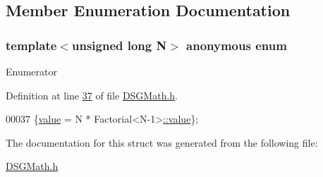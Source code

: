 \subsection{Member Enumeration Documentation}
\hypertarget{struct_d_s_g_1_1_factorial_a2443a477420ba8fc5494b186a58dcacc}{\subsubsection[{anonymous enum}]{\setlength{\rightskip}{0pt plus 5cm}template$<$unsigned long N$>$ anonymous enum}}\label{struct_d_s_g_1_1_factorial_a2443a477420ba8fc5494b186a58dcacc}
\begin{Desc}
\item[Enumerator]\par
\begin{description}
\item[{\em 
\hypertarget{struct_d_s_g_1_1_factorial_a2443a477420ba8fc5494b186a58dcaccaebc078d57d6fc1fbd5953d284c9cde04}{value}\label{struct_d_s_g_1_1_factorial_a2443a477420ba8fc5494b186a58dcaccaebc078d57d6fc1fbd5953d284c9cde04}
}]\end{description}
\end{Desc}


Definition at line \hyperlink{_d_s_g_math_8h_source_l00037}{37} of file \hyperlink{_d_s_g_math_8h_source}{D\+S\+G\+Math.\+h}.


\begin{DoxyCode}
00037 \{\hyperlink{struct_d_s_g_1_1_factorial_a2443a477420ba8fc5494b186a58dcaccaebc078d57d6fc1fbd5953d284c9cde04}{value} = N * Factorial<N-1>\hyperlink{struct_d_s_g_1_1_factorial_a2443a477420ba8fc5494b186a58dcaccaebc078d57d6fc1fbd5953d284c9cde04}{::value}\};
\end{DoxyCode}


The documentation for this struct was generated from the following file\+:\begin{DoxyCompactItemize}
\item 
\hyperlink{_d_s_g_math_8h}{D\+S\+G\+Math.\+h}\end{DoxyCompactItemize}
